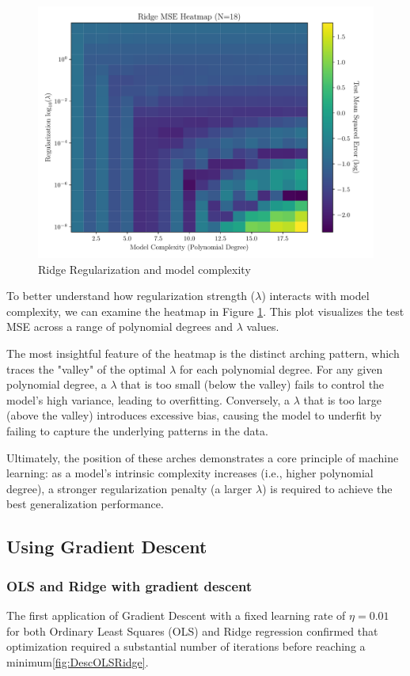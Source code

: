 \documentclass[twocolumn,aps]{revtex4}
\begin{document}
\begin{figure}[h]
    \centering
    \includegraphics[width=.95 \linewidth]{Figures/Ridge_Degree_Lambda_Heatmap.pdf}
    \caption{Ridge Regularization and model complexity}
    \label{fig:RidgeHeat}
\end{figure}

To better understand how regularization strength ($\lambda$) interacts with model complexity, we can examine the heatmap in Figure \ref{fig:RidgeHeat}. 
This plot visualizes the test MSE across a range of polynomial degrees and $\lambda$ values.

The most insightful feature of the heatmap is the distinct arching pattern, which traces the "valley" of the optimal $\lambda$ for each polynomial degree.
For any given polynomial degree, a $\lambda$ that is too small (below the valley) fails to control the model's high variance, leading to overfitting.
Conversely, a $\lambda$ that is too large (above the valley) introduces excessive bias, causing the model to underfit by failing to capture the underlying patterns in the data.

Ultimately, the position of these arches demonstrates a core principle of machine learning: as a model's intrinsic complexity increases (i.e., higher polynomial degree), a stronger regularization penalty (a larger $\lambda$) is required to achieve the best generalization performance.


\subsection{Using Gradient Descent}

\subsubsection{OLS and Ridge with gradient descent}
The first application of Gradient Descent with a fixed learning rate of $\eta=0.01$ for both Ordinary Least Squares (OLS) and Ridge regression confirmed that optimization required a substantial number of iterations before reaching a minimum\ref{fig:DescOLSRidge}.
\end{document}
